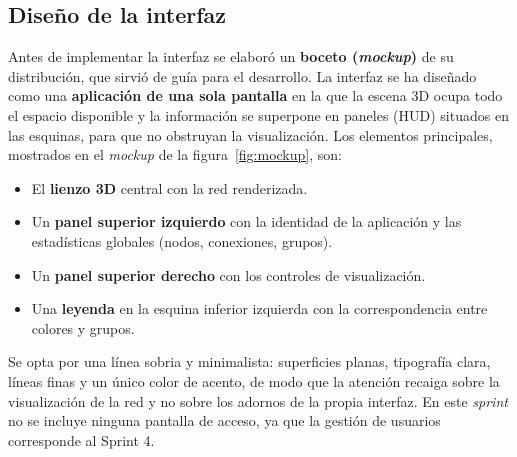 \subsection{Diseño de la interfaz}

Antes de implementar la interfaz se elaboró un \textbf{boceto (\textit{mockup})} de su distribución,
que sirvió de guía para el desarrollo. La interfaz se ha diseñado como una \textbf{aplicación de una
sola pantalla} en la que la escena 3D ocupa todo el espacio disponible y la información se superpone
en paneles (HUD) situados en las esquinas, para que no obstruyan la visualización. Los elementos
principales, mostrados en el \textit{mockup} de la figura~\ref{fig:mockup}, son:

\begin{itemize}
	\item El \textbf{lienzo 3D} central con la red renderizada.
	\item Un \textbf{panel superior izquierdo} con la identidad de la aplicación y las estadísticas
		globales (nodos, conexiones, grupos).
	\item Un \textbf{panel superior derecho} con los controles de visualización.
	\item Una \textbf{leyenda} en la esquina inferior izquierda con la correspondencia entre colores
		y grupos.
\end{itemize}

Se opta por una línea sobria y minimalista: superficies planas, tipografía clara, líneas finas y un
único color de acento, de modo que la atención recaiga sobre la visualización de la red y no sobre
los adornos de la propia interfaz. En este \textit{sprint} no se incluye ninguna pantalla de acceso,
ya que la gestión de usuarios corresponde al Sprint 4.

